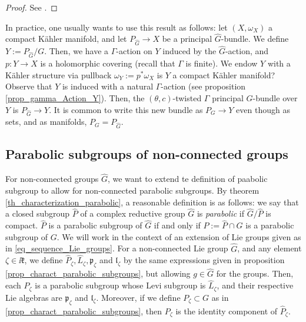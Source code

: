 \begin{proof}
    See \parencite[Sec. 4.1]{barajas2023non}.
\end{proof}

\begin{obs} \label{obs_equivalence_categories}
    In practice, one usually wants to use this result as follows: let \((X, \omega_X)\) a compact Kähler manifold, and let \(P_{\hat{G}} \to X\) be a principal \(\hat{G}\)-bundle. We define \(Y:=P_{\hat{G}}/G\). Then, we have a \(\Gamma\)-action on \(Y\) induced by the \(\hat{G}\)-action, and \(p\colon Y \to X\) is a holomorphic covering (recall that \(\Gamma\) is finite). We endow \(Y\) with a Kähler structure via pullback \(\omega_Y:=p^*\omega_X\) {\color{red}is \(Y\) a compact Kähler manifold?} Observe that \(Y\) is induced with a natural \(\Gamma\)-action (see proposition \ref{prop_gamma_Action_Y}). Then, the \((\theta,c)\)-twisted \(\Gamma\) principal \(G\)-bundle over \(Y\) is \(P_{\hat{G}}\to Y\). It is common to write this new bundle as \(P_G \to Y\) even though as sets, and as manifolds, \(P_G=P_{\hat{G}}\).
\end{obs}

\subsection{Parabolic subgroups of non-connected groups}
For non-connected groups \(\hat{G}\), we want to extend te definition of paabolic subgroup to allow for non-connected parabolic subgroups. By theorem \ref{th_characterization_parabolic}, a reasonable definition is as follows: we say that a closed subgroup \(\hat{P}\) of a complex reductive group \(\hat{G}\) is \textit{parabolic} if \(\hat{G}/\hat{P}\) is compact. \(\hat{P}\) is a parabolic subgroup of \(\hat{G}\) if and only if \(P:=\hat{P}\cap G\) is a parabolic subgroup of \(G\). We will work in the context of an extension of Lie groups given as in \eqref{eq_sequence_Lie_groups}. For a non-connected Lie group \(\hat{G}\), and any element \(\zeta \in \ii \mathfrak{k}\), we define \(\hat{P}_\zeta, \hat{L}_\zeta, \mathfrak{p}_\zeta\) and \(\mathfrak{l}_\zeta\) by the same expressions given in proposition \ref{prop_charact_parabolic_subgroups}, but allowing \(g \in \hat{G}\) for the groups. Then, each \(\hat{P}_\zeta\) is a parabolic subgroup whose Levi subgroup is \(\hat{L}_\zeta\), and their respective Lie algebras are \(\mathfrak{p}_\zeta\) and \(\mathfrak{l}_\zeta\). Moreover, if we define \(P_\zeta\subset G\) as in \ref{prop_charact_parabolic_subgroups}, then \(P_\zeta\) is the identity component of \(\hat{P}_\zeta\). \\



